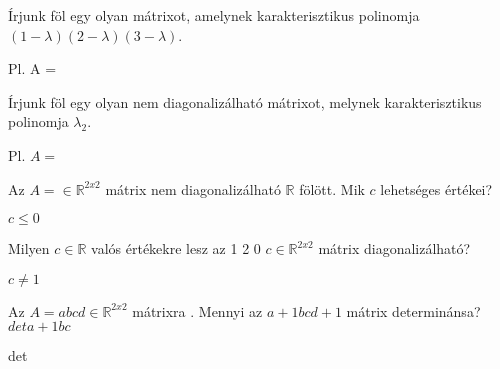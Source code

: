 \begin{frame}
  \begin{tcolorbox}[title={8/2. {\symknight}}]
     Írjunk föl egy olyan mátrixot, amelynek karakterisztikus polinomja $(1-{\lambda})(2-{\lambda})(3-{\lambda})$.

  \tcblower

    \mmedskip 
    
     Pl. A =
  \end{tcolorbox}
\end{frame}


\begin{frame}
  \begin{tcolorbox}[title={8/3. {\symrook}}]
    Írjunk föl egy olyan nem diagonalizálható mátrixot, melynek karakterisztikus polinomja ${\lambda}_2$.

  \tcblower

    \mmedskip 
    
    Pl. $A =$
  \end{tcolorbox}
\end{frame}


\begin{frame}
  \begin{tcolorbox}[title={8/4. {\symqueen}}]
    Az $A =  \in \mathbb{R}^{2 x 2}$ mátrix nem diagonalizálható $\mathbb{R}$ fölött. Mik $c$ lehetséges értékei?


  \tcblower

    \mmedskip 
    
    $c \leq 0$
  \end{tcolorbox}
\end{frame}


\begin{frame}
  \begin{tcolorbox}[title={8/5. {\symqueen}}]
    Milyen $c \in \mathbb{R}$ valós értékekre lesz az 1 2 0 $c \in \mathbb{R}^{2 x 2}$ mátrix diagonalizálható?

  \tcblower

    \mmedskip 
    
     $c \neq 1$
  \end{tcolorbox}
\end{frame}


\begin{frame}
  \begin{tcolorbox}[title={8/6. {\symqueen}}]
     Az $A =a b c d \in \mathbb{R}^{2 x 2}$ mátrixra . Mennyi az $a + 1 b c d + 1$ mátrix determinánsa? $det a + 1 b c$ 

  \tcblower

    \mmedskip 
    
     det
  \end{tcolorbox}
\end{frame}


